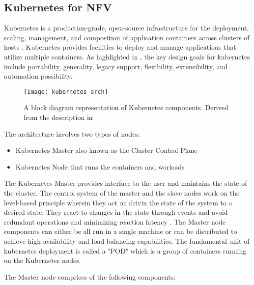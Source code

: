 \subsection{Kubernetes for NFV}
	
\begin{flushleft}
    Kubernetes is a production-grade, open-source infrastructure for the deployment, scaling, management, and composition of application containers across clusters of hosts \cite{k8sarch}. Kubernetes provides facilities to deploy and manage applications that utilize multiple containers. As highlighted in \cite{k8sarch}, the key design goals for kubernetes include portability, generality, legacy support, flexibility, extensibility, and automation possibility. 
\end{flushleft}

\begin{figure}
    \centering
    \texttt{[image: kubernetes\_arch]}
    \label{fig:figure14}
    \caption{A block diagram representation of Kubernetes components. Derived from the description in \cite{k8sarch}}
\end{figure}

The architecture involves two types of nodes:
\begin{itemize}
    \item Kubernetes Master also known as the Cluster Control Plane
    \item Kubernetes Node that runs the containers and worloads
\end{itemize}

The Kubernetes Master provides interface to the user and maintains the state of the cluster. The control system of the master and the slave nodes work on the level-based principle wherein they act on drivin the state of the system to a desired state. They react to changes in the state through events and avoid redundant operations and minimizing reaction latency \cite{k8sarch}.
The Master node components can either be all run in a single machine or can be distributed to achieve high availability and load balancing capabilities.
The fundamental unit of kubernetes deployment is called a "POD" which is a group of containers running on the Kubernetes nodes.


The Master node comprises of the following components:

